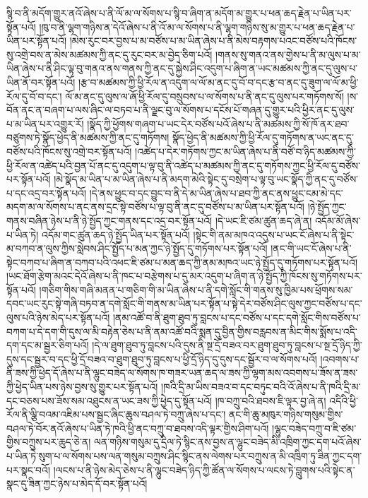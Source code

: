 སྙི་བ་ནི་མདོག་གྱུར་ནའོ་ཞེས་པ་ནི་ལོ་མ་ལ་སོགས་པ་སྙི་བ་ཞིག་ན་མདོག་མ་གྱུར་པ་ཕན་ཆད་རྗེན་པ་ཡིན་པར་སྟོན་པའོ། །ཁུ་བ་ནི་ལྷག་གཉིས་ན་དེའོ་ཞེས་པ་ནི་འོ་མ་ལ་སོགས་པ་ནི་ལྷག་གཉིས་སུ་མ་གྱུར་པ་ཕན་ཆད་རྗེན་པ་ཡིན་པར་སྟོན་པའོ། །མེས་རུང་བར་བྱས་པ་མ་བཙོས་པ་མ་ཡིན་ཞེས་པ་ནི་མེས་བརྟགས་པའང་བཙོས་པའི་ཁོངས་སུ་འགྲེ་བས་ན་མེས་མཚམས་ཀྱི་ནང་དུ་རུང་བར་མ་བྱེད་ཅིག་པའོ། །གནས་སུ་གནའ་ནས་གྱེས་པ་ནི་མ་ལུས་པ་མ་ཡིན་ཞེས་པ་ནི་ཤིང་ལྟ་བུ་གནའ་ནས་གནས་ཀྱི་ནང་དུ་སྐྱེས་ཤིང་འདུག་པ་ཞིག་ན་ཡང་མཚམས་ཀྱི་ནང་དུ་ལུས་པ་ཡིན་ནོ་བར་སྟོན་པའོ། །རྩ་བ་མཚམས་ཀྱི་ཕྱི་རོལ་ན་འདུག་ལ་ལོ་མ་ནང་དུ་བོ་བ་དང་རྩ་བ་ནང་དུ་ཟུག་ལ་ལོ་མ་ཕྱི་རོལ་དུ་བོ་བ་དང་། ལོ་མ་ནང་དུ་ལུས་ལ་ཞོ་ཕྱི་རོལ་དུ་བསྲུབས་པ་ལ་སོགས་པ་ནི་ནང་དུ་ལུས་པར་གཏོགས་སོ། །ས་བོན་ནང་ན་བཞག་པ་ལས་ཞིང་ལ་བཏབ་པ་ནི་ལྗང་བུ་ལ་སོགས་པ་དངོས་པོ་གཞན་དུ་གྱུར་པའི་ཕྱིར་ནང་དུ་ལུས་པ་མ་ཡིན་པར་འགྱུར་རོ། །སྣོད་ཀྱི་ཕྱོགས་གཞག་པ་ཡང་དེར་བཙོས་པའོ་ཞེས་པ་ནི་མཚམས་ཀྱི་སོ་ཁོ་ནར་ཐབ་བཙུགས་ཏེ་སྣོད་ཕྱེད་ནི་མཚམས་ཀྱི་ནང་དུ་གཏོགས། སྣོད་ཕྱེད་ནི་མཚམས་ཀྱི་ཕྱི་རོལ་དུ་གཏོགས་ན་ཡང་ནང་དུ་བཙོས་པའི་ཁོངས་སུ་འགྲེ་བར་སྟོན་པའོ། །འཚེད་པ་དེར་གཏོགས་ཀྱང་མ་ཡིན་ཞེས་པ་ནི་བཙོ་བ་ཉིད་མཚམས་ཀྱི་ཕྱི་རོལ་ན་འཚེད་པའི་བྱན་པོ་ནང་དུ་འདུག་པ་ལྟ་བུ་ནི་འཚེད་པ་མཚམས་ཀྱི་ནང་དུ་གཏོགས་ཀྱང་ཕྱི་རོལ་དུ་བཙོས་པར་སྟོན་པའོ། །མེ་སྣོད་མ་ཡིན་པ་མ་ཡིན་ཞེས་པ་ནི་མདག་མེའི་སྟེང་དུ་བསྲེག་པ་ལྟ་བུ་ཡང་སྣོད་ཀྱི་ནང་དུ་བཙོས་པ་དང་འདྲ་བར་སྟོན་པའོ། །དེ་ནས་ཕྱུང་བ་དང་བྱུང་བ་ནི་དེ་མ་ཡིན་ཞེས་པ་ཐབ་ཀྱི་ནང་ནས་ཕྱུང་ངམ་མེ་དང་མདག་མ་ལ་སོགས་པ་ནང་ནས་དྲང་སྟེ་བཙོས་པ་ལྟ་བུ་ནི་ནང་དུ་བཙོས་པ་མ་ཡིན་པར་སྟོན་པའོ། །ཉེ་སྤྱོད་ཀྱང་གནས་བཞིན་ཉེས་པ་ནི་ཉེ་སྤྱོད་ཀྱང་གནས་དང་འདྲ་བར་སྟོན་པའོ། །དེ་ཡང་ཇི་ཙམ་ཚུན་ཆད་ཞེ་ན། འདོམ་མོ་ཞེས་པ་ཡིན་ཏེ། འདོམ་གང་ཚུན་ཆད་ཉེ་སྤྱོད་ཡིན་པར་སྟོན་པའོ། །སྟེང་གི་ནམ་མཁའ་འདུས་པ་ཡང་ངོ་ཞེས་པ་ནི་སྟེང་མ་བཀབ་ན་ལུས་ཀྱིས་སླེབས་ཤིང་སྤྱོད་པ་མན་ཀྱང་ཉེ་སྤྱོད་དུ་གཏོགས་པར་སྟོན་པའོ། །ནང་གི་ཡང་ངོ་ཞེས་པ་ནི་སྟེང་བཀབ་པ་ཞིག་ན་བཀབ་པའི་འཕང་ཇི་ཙམ་པ་མན་ཆད་ཀྱི་ནམ་མཁའ་ཡང་ཉེ་སྤྱོད་དུ་གཏོགས་པར་སྟོན་པའོ། །ཡང་ཐོག་རྩེག་མའང་དེའོ་ཞེས་པ་ནི་ཁང་པ་བརྩེགས་པ་དུ་མར་འདུག་པ་ཞིག་ན་ཉེ་སྤྱོད་ཀྱི་ཁོངས་སུ་གཏོགས་པར་སྟོན་པའོ། །གཅིག་གིས་གཞི་མནན་པ་གཅིག་གི་མ་ཡིན་ཞེས་པ་ནི་དགེ་སློང་གི་གནས་སུ་ཁྱིམ་པས་ཕྲོགས་སམ་དབང་ཡང་རུང་སྟེ་གཞི་བཏབ་ན་དགེ་སློང་གི་གནས་མ་ཡིན་པར་སྟོན་པ་སྟེ་དེར་བཙོས་ཤིང་ལུས་ཀྱང་བཙོས་པ་དང་ལུས་པའི་ཉེས་མེད་པར་སྟོན་པའོ། །ནམ་འཚོ་བ་ནི་ཐུག་ཐུབ་ཏུ་བླངས་པ་དང་བཙོས་པ་དང་དགེ་སློང་གིས་བཙོས་པ་བཀག་པ་དེ་དག་གི་དུས་ལ་མི་བརྟེན་ཅེས་པ་ནི་ནམ་འཚོ་བའི་སྨན་དུ་བྱིན་གྱིས་བརླབས་ན་མིང་གིས་སྨོས་པ་འདི་དག་དང་མ་སྦྱར་ཅིག་པའོ། །དེ་ལ་ཐུག་ཐུབ་ཏུ་བླངས་པའི་དུས་ནི་སྔ་དྲོ་བཟའ་བར་ཐུག་ཐུབ་ཏུ་བླངས་པ་སྔ་དྲོ་ཉིད་ཀྱི་དུས་དང་སྦྱར་བ་དང་ཕྱི་དྲོ་བཟའ་བ་ཐུག་ཐུབ་ཏུ་བླངས་པ་ཕྱི་དྲོ་ཉིད་དུ་དུས་དང་སྦྱོར་བ་ལ་སོགས་པའོ། །འབགས་པ་ནི་ཟས་ཀྱི་ཕྱེད་དོ་ཞེས་པ་ནི་ལྷུང་བཟེད་ལ་སོགས་ཁ་གཟར་ཡན་ཆད་ལ་ཟས་ཀྱི་ལྷག་མས་འབགས་པ་ཟོས་ན་ཟས་ཀྱི་ཕྱེད་ཡིན་པས་ཉེས་བྱས་སུ་གྱུར་པར་སྟོན་པའོ། །ཁའི་དྲི་མ་ཡིས་བཟའ་བ་དང་བཏུང་བའི་འོ་ཞེས་པ་ནི་ཁའི་དྲི་མ་དང་བཅས་པས་ཟོས་སམ་འཐུངས་ན་ཡང་ཟས་ཀྱི་ཕྱེད་དུ་སྟོན་པའོ། །ཁ་བཀྲུ་བའི་ཐབས་ཇི་ལྟར་བྱ་ཞེ་ན། འདིའི་ཕྱི་རོལ་ནི་ལྕི་བའམ་འཇིམ་པས་སྦྱང་ཞིང་ཆུས་བཤལ་ཏེ་བཀྲུ་ཞེས་པ་དང་། ནང་གི་ཆུ་མཁུར་གཉིས་གསུམ་གྱིས་བཤལ་ཏེ་བོར་ནའོ་ཞེས་པ་ཡིན་ཏེ་ཁའི་ཕྱི་ནང་བཀྲུ་བ་ཐབས་འདི་ལྟར་གྱིས་ཤིག་པའོ། །ལྷུང་བཟེད་བཀྲུ་བ་ཇི་ཙམ་གྱིས་བཀྲུས་པར་ཆུད་ཅེ་ན། ལན་གཉིས་གསུམ་དུ་དྲིལ་ཏེ་སྙིང་ནས་བྱས་ན་ལྷུང་བཟེད་མི་འཁྲིག་ཀྱང་དག་པའོ་ཞེས་པ་ཡིན་ཏེ་སུག་པ་ལ་སོགས་པས་ལན་གསུམ་བཀྲུས་ཤིང་སྙིང་ནས་ལེགས་པར་བཀྲུས་ན་མི་འཁྲིག་ཏུ་ཟིན་ཀྱང་དག་པར་སྣང་བའོ། །ལངས་པ་ནི་ཉེས་མེད་ཅེས་པ་ནི་ལྷུང་བཟེད་ཉིད་ཀྱི་ཚོན་ལ་སོགས་པ་ལངས་ཏེ་བླུགས་པའི་སྟེང་ན་སྣང་དུ་ཟིན་ཀྱང་ཉེས་པ་མེད་དོ་བར་སྟོན་པའོ། 